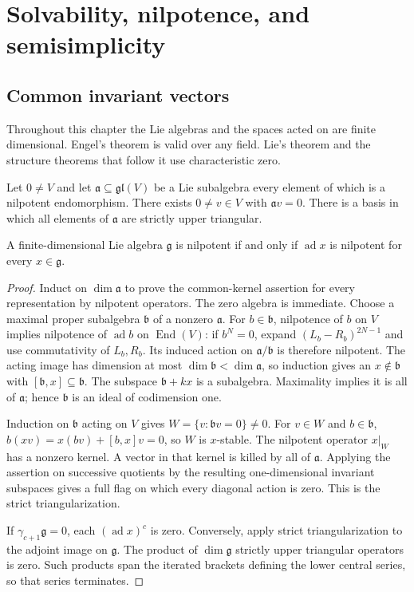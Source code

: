 \chapter{Solvability, nilpotence, and semisimplicity}
\label{ch:structure}

\section{Common invariant vectors}

Throughout this chapter the Lie algebras and the spaces acted on
are finite dimensional. Engel's theorem is valid over any field.
Lie's theorem and the structure theorems that follow it use
characteristic zero.

\begin{theorem}[Engel]\label{res:B01}
Let \(0\ne V\) and let \(\mathfrak a\subseteq\mathfrak{gl}(V)\)
be a Lie subalgebra every element of which is a nilpotent
endomorphism. There exists \(0\ne v\in V\) with \(\mathfrak a v=0\).
There is a basis in which all elements of \(\mathfrak a\) are
strictly upper triangular.

A finite-dimensional Lie algebra \(\mathfrak g\) is nilpotent
if and only if \(\operatorname{ad}x\) is nilpotent for every
\(x\in\mathfrak g\).
\end{theorem}

\begin{proof}
Induct on \(\dim\mathfrak a\) to prove the common-kernel
assertion for every representation by nilpotent operators.
The zero algebra is immediate. Choose a maximal proper
subalgebra \(\mathfrak b\) of a nonzero \(\mathfrak a\).
For \(b\in\mathfrak b\), nilpotence of \(b\) on \(V\)
implies nilpotence of \(\operatorname{ad}b\) on
\(\operatorname{End}(V)\): if \(b^N=0\), expand
\((L_b-R_b)^{2N-1}\) and use commutativity of \(L_b,R_b\).
Its induced action on \(\mathfrak a/\mathfrak b\) is
therefore nilpotent. The acting image has dimension at most
\(\dim\mathfrak b<\dim\mathfrak a\), so induction gives
an \(x\notin\mathfrak b\) with
\([\mathfrak b,x]\subseteq\mathfrak b\).
The subspace \(\mathfrak b+kx\) is a subalgebra.
Maximality implies it is all of \(\mathfrak a\); hence
\(\mathfrak b\) is an ideal of codimension one.

Induction on \(\mathfrak b\) acting on \(V\) gives
\(W=\{v:\mathfrak b v=0\}\ne0\).
For \(v\in W\) and \(b\in\mathfrak b\),
\(b(xv)=x(bv)+[b,x]v=0\), so \(W\) is \(x\)-stable.
The nilpotent operator \(x|_W\) has a nonzero kernel.
A vector in that kernel is killed by all of \(\mathfrak a\).
Applying the assertion on successive quotients by the
resulting one-dimensional invariant subspaces gives a full
flag on which every diagonal action is zero. This is the
strict triangularization.

If \(\gamma_{c+1}\mathfrak g=0\), each
\((\operatorname{ad}x)^c\) is zero. Conversely, apply strict
triangularization to the adjoint image on \(\mathfrak g\).
The product of \(\dim\mathfrak g\) strictly upper triangular
operators is zero. Such products span the iterated brackets
defining the lower central series, so that series terminates.
\end{proof}

